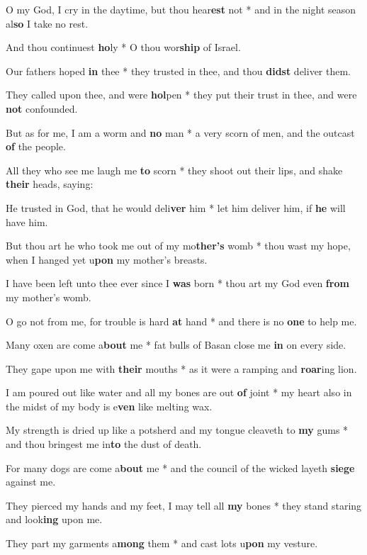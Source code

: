 \begin{multicols}{2}
	O my God, I cry in the daytime, but thou hear\textbf{est} not * and in the night season al\textbf{so} I take no rest.
	
	And thou continuest \textbf{ho}ly * O thou wor\textbf{ship} of Israel.
	
	Our fathers hoped \textbf{in} thee * they trusted in thee, and thou \textbf{didst} deliver them.
	
	They called upon thee, and were \textbf{hol}pen * they put their trust in thee, and were \textbf{not} confounded.
	
	But as for me, I am a worm and \textbf{no} man * a very scorn of men, and the outcast \textbf{of} the people.
	
	All they who see me laugh me \textbf{to} scorn * they shoot out their lips, and shake \textbf{their} heads, saying:
	
	He trusted in God, that he would deli\textbf{ver} him * let him deliver him, if \textbf{he} will have him.
	
	But thou art he who took me out of my mo\textbf{ther's} womb * thou wast my hope, when I hanged yet u\textbf{pon} my mother's breasts.
	
	I have been left unto thee ever since I \textbf{was} born * thou art my God even \textbf{from} my mother's womb.
	
	O go not from me, for trouble is hard \textbf{at} hand * and there is no \textbf{one} to help me.
	
	Many oxen are come a\textbf{bout} me * fat bulls of Basan close me \textbf{in} on every side.
	
	They gape upon me with \textbf{their} mouths * as it were a ramping and \textbf{roar}ing lion.
	
	I am poured out like water and all my bones are out \textbf{of} joint * my heart also in the midst of my body is e\textbf{ven} like melting wax.
	
	My strength is dried up like a potsherd and my tongue cleaveth to \textbf{my} gums * and thou bringest me in\textbf{to} the dust of death.
	
	For many dogs are come a\textbf{bout} me * and the council of the wicked layeth \textbf{siege} against me.
	
	They pierced my hands and my feet, I may tell all \textbf{my} bones * they stand staring and look\textbf{ing} upon me.
	
	They part my garments a\textbf{mong} them * and cast lots u\textbf{pon} my vesture.
	

\end{multicols}
